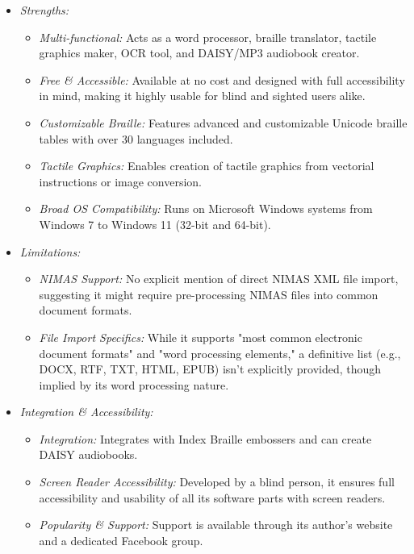 \begin{itemize}
    \item \emph{Strengths:}
    \begin{itemize}
        \item \emph{Multi-functional:} Acts as a word processor, braille translator, tactile graphics maker, OCR tool, and DAISY/MP3 audiobook creator\footnotemark{}.
        \item \emph{Free \& Accessible:} Available at no cost and designed with full accessibility in mind, making it highly usable for blind and sighted users alike\footnotemark{}.
        \item \emph{Customizable Braille:} Features advanced and customizable Unicode braille tables with over 30 languages included.
        \item \emph{Tactile Graphics:} Enables creation of tactile graphics from vectorial instructions or image conversion.
        \item \emph{Broad OS Compatibility:} Runs on Microsoft Windows systems from Windows 7 to Windows 11 (32-bit and 64-bit).
    \end{itemize}
    \item \emph{Limitations:}
    \begin{itemize}
        \item \emph{NIMAS Support:} No explicit mention of direct NIMAS XML file import, suggesting it might require pre-processing NIMAS files into common document formats.
        \item \emph{File Import Specifics:} While it supports "most common electronic document formats" and "word processing elements," a definitive list (e.g., DOCX, RTF, TXT, HTML, EPUB) isn't explicitly provided, though implied by its word processing nature.
    \end{itemize}
    \item \emph{Integration \& Accessibility:}
    \begin{itemize}
        \item \emph{Integration:} Integrates with Index Braille embossers and can create DAISY audiobooks.
        \item \emph{Screen Reader Accessibility:} Developed by a blind person, it ensures full accessibility and usability of all its software parts with screen readers.
        \item \emph{Popularity \& Support:} Support is available through its author's website and a dedicated Facebook group.
    \end{itemize}
\end{itemize}

